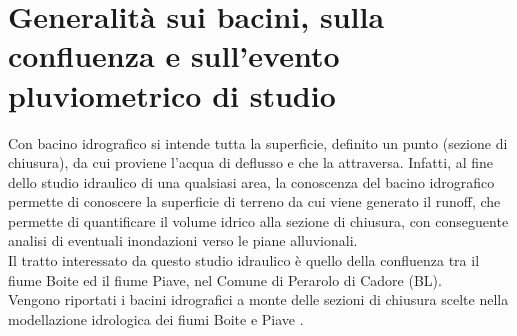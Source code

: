 \section{Generalità sui bacini, sulla confluenza e sull'evento pluviometrico di studio}
\label{section:evento_pluviometrico}
Con bacino idrografico si intende tutta la superficie, definito un punto (sezione di chiusura), da cui proviene l'acqua di deflusso e che la attraversa. Infatti, al fine dello studio idraulico di una qualsiasi area, la conoscenza del bacino idrografico permette di conoscere la superficie di terreno da cui viene generato il runoff, che permette di quantificare il volume idrico alla sezione di chiusura, con conseguente analisi di eventuali inondazioni verso le piane alluvionali.\\
Il tratto interessato da questo studio idraulico è quello della confluenza tra il fiume Boite ed il fiume Piave, nel Comune di Perarolo di Cadore (BL).\\
Vengono riportati i bacini idrografici a monte delle sezioni di chiusura scelte nella modellazione idrologica dei fiumi Boite \cite{fiume_boite} e Piave \cite{fiume_piave}.
